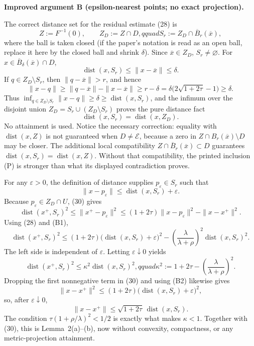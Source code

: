 \documentclass[11pt]{article}
\newenvironment{improved}{\par\begingroup\color{red}}{\par\endgroup}
\newcommand{\E}{\mathcal E}
\newcommand{\dist}{\operatorname{dist}}
\newcommand{\barx}{\overline{x}}
\begin{document}
\begin{improved}
\textbf{Improved argument B (epsilon-nearest points; no exact projection).}

The correct distance set for the residual estimate (28) is
\[
 Z:=F^{-1}(0),\qquad Z_D:=Z\cap D,qquad S_r:=Z_D\cap \overline B_r(\barx),
\]
where the ball is taken closed (if the paper's notation is read as an open ball, replace it here by the closed ball and shrink \(\delta\)). Since \(\barx\in Z_D\), \(S_r\ne\varnothing\). For \(x\in\overline B_\delta(\barx)\cap D\),
\[
 \dist(x,S_r)\le\|x-\barx\|\le\delta.
\]
If \(q\in Z_D\setminus S_r\), then \(\|q-\barx\|>r\), and hence
\[
 \|x-q\|\ge\|q-\barx\|-\|x-\barx\|\ge r-\delta
 =\delta\bigl(2\sqrt{1+2\tau}-1\bigr)\ge\delta.
\]
Thus \(\inf_{q\in Z_D\setminus S_r}\|x-q\|\ge\delta\ge\dist(x,S_r)\), and the infimum over the disjoint union \(Z_D=S_r\cup(Z_D\setminus S_r)\) proves the pure distance fact
\begin{equation}
 \boxed{\dist(x,S_r)=\dist(x,Z_D)}.                         \tag{B1}
\end{equation}
No attainment is used. Notice the necessary correction: equality with \(\dist(x,Z)\) is not guaranteed when \(D\ne\E\), because a zero in \(Z\cap B_r(\barx)\setminus D\) may be closer. The additional local compatibility \(Z\cap\overline B_r(\barx)\subset D\) guarantees \(\dist(x,S_r)=\dist(x,Z)\). Without that compatibility, the printed inclusion (P) is stronger than what its displayed contradiction proves.

For any \(\varepsilon>0\), the definition of distance supplies \(p_\varepsilon\in S_r\) such that
\begin{equation}
 \|x-p_\varepsilon\|\le\dist(x,S_r)+\varepsilon.           \tag{B2}
\end{equation}
Because \(p_\varepsilon\in Z_D\cap U\), (30) gives
\[
 \dist(x^+,S_r)^2
 \le\|x^+-p_\varepsilon\|^2
 \le(1+2\tau)\|x-p_\varepsilon\|^2-\|x-x^+\|^2.
\]
Using (28) and (B1),
\begin{equation}
 \dist(x^+,S_r)^2
 \le(1+2\tau)\bigl(\dist(x,S_r)+\varepsilon\bigr)^2
 -\left(\frac{\lambda}{\lambda+\rho}\right)^2\dist(x,S_r)^2. \tag{B3}
\end{equation}
The left side is independent of \(\varepsilon\). Letting \(\varepsilon\downarrow0\) yields
\begin{equation}
 \dist(x^+,S_r)^2\le\kappa^2\dist(x,S_r)^2,qquad
 \kappa^2:=1+2\tau-\left(\frac{\lambda}{\lambda+\rho}\right)^2.  \tag{B4}
\end{equation}
Dropping the first nonnegative term in (30) and using (B2) likewise gives
\[
 \|x-x^+\|^2\le(1+2\tau)\bigl(\dist(x,S_r)+\varepsilon\bigr)^2,
\]
so, after \(\varepsilon\downarrow0\),
\[
 \|x-x^+\|\le\sqrt{1+2\tau}\,\dist(x,S_r).
\]
The condition \(\tau(1+\rho/\lambda)^2<1/2\) is exactly what makes \(\kappa<1\). Together with (30), this is Lemma~2(a)--(b), now without convexity, compactness, or any metric-projection attainment.
\end{improved}
\end{document}
